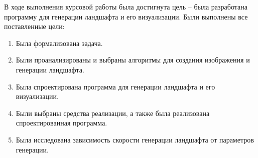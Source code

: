 
В ходе выполнения курсовой работы была достигнута цель -- была разработана программу для генерации ландшафта и его визуализации. Были выполнены все поставленные цели:

\begin{enumerate}[label=\arabic*.]
	\item Была формализована задача.
	\item Были проанализированы и выбраны алгоритмы для создания изображения и генерации ландшафта.
	\item Была спроектирована программа для генерации ландшафта и его визуализации.
	\item Были выбраны средства реализации, а также была реализована спроектированная программа.
	\item Была исследована зависимость скорости генерации ландшафта от параметров генерации.
\end{enumerate}